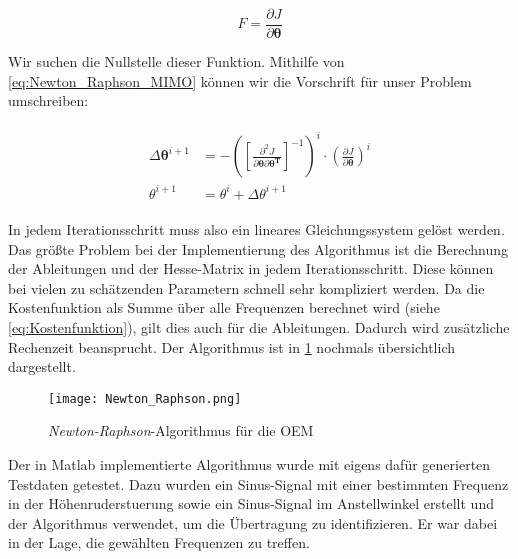 \begin{equation}
	{F} = \frac{\partial J}{\partial \mathbf{\theta}}
	\label{eq:Newton_Raphson_1}
\end{equation}

Wir suchen die Nullstelle dieser Funktion. Mithilfe von \cref{eq:Newton_Raphson_MIMO} können wir die Vorschrift für 
unser Problem umschreiben:

\begin{align}
	\begin{split}
		\Delta \mathbf{\theta}^{i+1} &= -\left(\left[  \frac{\partial^{2}J}{\partial \mathbf{\theta} \partial 
		\mathbf{\theta^T}}\right]^{-1} \right)^{i} \cdot \left(\frac{\partial J}{\partial \mathbf{\theta}}\right)^{i} \\
		\theta^{i+1} &= \theta^{i} + \Delta\theta^{i+1}
		\label{eq:Newton_Raphson_2}
	\end{split}
\end{align}

In jedem Iterationsschritt muss also ein lineares Gleichungssystem gelöst werden. Das größte Problem bei der Implementierung 
des Algorithmus ist die Berechnung der Ableitungen und der Hesse-Matrix in jedem Iterationsschritt. Diese können bei vielen 
zu schätzenden Parametern schnell sehr kompliziert werden. Da die Kostenfunktion als Summe über alle Frequenzen berechnet 
wird (siehe \cref{eq:Kostenfunktion}), gilt dies auch für die Ableitungen. Dadurch wird zusätzliche Rechenzeit beansprucht. 
Der Algorithmus ist in \cref{fig:Newton_Raphson} nochmals übersichtlich dargestellt.  

\begin{figure}[h!]
	\centering
	\texttt{[image: Newton\_Raphson.png]}
	\caption{\textit{Newton-Raphson}-Algorithmus für die OEM}
	\label{fig:Newton_Raphson}
\end{figure}

Der in Matlab implementierte Algorithmus wurde mit eigens dafür generierten Testdaten getestet. Dazu wurden ein Sinus-Signal 
mit einer bestimmten Frequenz in der Höhenruderstuerung sowie ein Sinus-Signal im Anstellwinkel erstellt und der Algorithmus 
verwendet, um die Übertragung zu identifizieren. Er war dabei in der Lage, die gewählten Frequenzen zu treffen.



